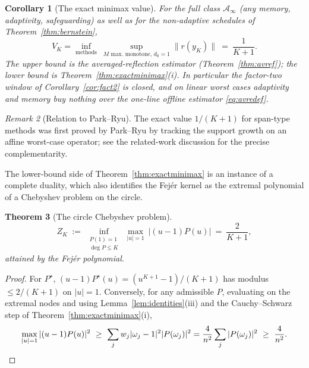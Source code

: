 \documentclass[11pt]{article}
\newtheorem{theorem}{Theorem}[section]
\newtheorem{corollary}[theorem]{Corollary}
\theoremstyle{definition}
\theoremstyle{remark}
\newtheorem{remark}[theorem]{Remark}
\newcommand{\Aa}{\mathcal{A}}
\newcommand{\norm}[1]{\| #1 \|}
\newcommand{\abs}[1]{| #1 |}
\begin{document}
\begin{corollary}[The exact minimax value]\label{cor:exactV}
For the full class $\Aa_\infty$ (any memory, adaptivity, safeguarding) as
well as for the non-adaptive schedules of Theorem~\ref{thm:bernstein},
\[
V_K=\inf_{\text{methods}}\ \sup_{M\text{ max.\ monotone},\,d_0=1}
\norm{r(y_K)}\ =\ \frac1{K+1}.
\]
The upper bound is the averaged-reflection estimator
(Theorem~\ref{thm:avref}); the lower bound is
Theorem~\ref{thm:exactminimax}(i). In particular the factor-two window of
Corollary~\ref{cor:fact2} is closed, and on linear worst cases adaptivity
and memory buy nothing over the one-line offline estimator \eqref{eq:avredef}.
\end{corollary}

\begin{remark}[Relation to Park--Ryu]\label{rem:parkryu}
The exact value $1/(K+1)$ for span-type methods was first proved by
Park--Ryu \cite[Thm.~4.1]{park2022exact} by tracking the support growth on
an affine worst-case operator; see the related-work discussion for the
precise complementarity.
\end{remark}

The lower-bound side of Theorem~\ref{thm:exactminimax} is an instance of a
complete duality, which also identifies the Fej\'er kernel as the extremal
polynomial of a Chebyshev problem on the circle.

\begin{theorem}[The circle Chebyshev problem]\label{thm:chebyshev}
\[
Z_K\ :=\ \inf_{\substack{P(1)=1\\\deg P\le K}}\
\max_{\abs u=1}\ \abs{(u-1)P(u)}\ =\ \frac2{K+1},
\]
attained by the Fej\'er polynomial.
\end{theorem}
\begin{proof}
For $P^\star$, $(u-1)P^\star(u)=(u^{K+1}-1)/(K+1)$ has modulus
$\le2/(K+1)$ on $\abs u=1$. Conversely, for any admissible $P$, evaluating
on the extremal nodes and using Lemma~\ref{lem:identities}(iii) and the
Cauchy--Schwarz step of Theorem~\ref{thm:exactminimax}(i),
\[
\max_{\abs u=1}\abs{(u-1)P(u)}^2
\ \ge\ \sum_j w_j\abs{\omega_j-1}^2\abs{P(\omega_j)}^2
=\frac4{n^2}\sum_j\abs{P(\omega_j)}^2
\ \ge\ \frac4{n^2}. \qedhere
\]
\end{proof}
\end{document}
